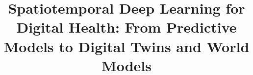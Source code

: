 \documentclass[acmsmall]{acmart}
\begin{document}










\title{Spatiotemporal Deep Learning for Digital Health: From Predictive Models to Digital Twins and World Models}
\end{document}
